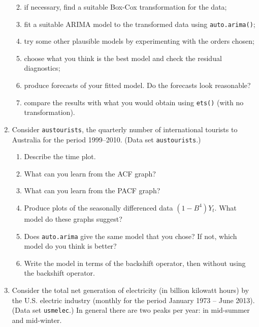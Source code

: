\documentclass[]{book}
\providecommand{\tightlist}{%
  \setlength{\itemsep}{0pt}\setlength{\parskip}{0pt}}
\begin{document}
\begin{enumerate}
  \begin{enumerate}
  \def\labelenumii{\alph{enumii}.}
  \tightlist
  \item
    if necessary, find a suitable Box-Cox transformation for the data;
  \item
    fit a suitable ARIMA model to the transformed data using \texttt{auto.arima()};
  \item
    try some other plausible models by experimenting with the orders chosen;
  \item
    choose what you think is the best model and check the residual diagnostics;
  \item
    produce forecasts of your fitted model. Do the forecasts look reasonable?
  \item
    compare the results with what you would obtain using \texttt{ets()} (with no transformation).
  \end{enumerate}
\item
  Consider \texttt{austourists}, the quarterly number of international tourists to Australia for the period 1999--2010. (Data set \texttt{austourists}.)

  \begin{enumerate}
  \def\labelenumii{(\alph{enumii})}
  \tightlist
  \item
    Describe the time plot.
  \item
    What can you learn from the ACF graph?
  \item
    What can you learn from the PACF graph?
  \item
    Produce plots of the seasonally differenced data \((1 - B^{4})Y_{t}\). What model do these graphs suggest?
  \item
    Does \texttt{auto.arima} give the same model that you chose? If not, which model do you think is better?
  \item
    Write the model in terms of the backshift operator, then without using the backshift operator.
  \end{enumerate}
\item
  Consider the total net generation of electricity (in billion kilowatt hours) by the U.S. electric industry (monthly for the period January 1973 -- June 2013). (Data set \texttt{usmelec}.) In general there are two peaks per year: in mid-summer and mid-winter.


\end{enumerate}
\end{document}
